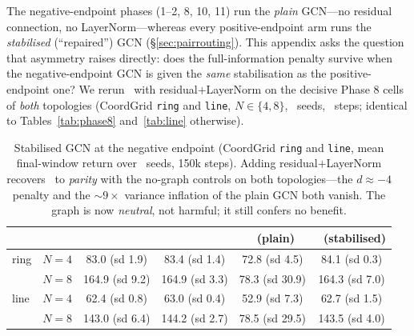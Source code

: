 \begin{appendices}
The negative-endpoint phases (1--2, 8, 10, 11) run the \emph{plain}
GCN---no residual connection, no LayerNorm---whereas every positive-endpoint
arm runs the \emph{stabilised} (``repaired'') GCN
(\S\ref{sec:pairrouting}). This appendix asks the question that asymmetry
raises directly: does the full-information penalty survive when the
negative-endpoint GCN is given the \emph{same} stabilisation as the
positive-endpoint one? We rerun \gnnqmix\ with residual$+$LayerNorm on the
decisive Phase 8 cells of \emph{both} topologies (CoordGrid \texttt{ring}
and \texttt{line}, $N\in\{4,8\}$,
\PEseeds\ seeds, \PEsteps\ steps; identical to Tables~\ref{tab:phase8}
and~\ref{tab:line} otherwise).

\begin{table}[!ht]
  \centering
  \footnotesize
  \caption{Stabilised GCN at the negative endpoint (CoordGrid
  \texttt{ring} and \texttt{line}, mean final-window return over \PEseeds\
  seeds, 150k steps).
  Adding residual$+$LayerNorm recovers \gnnqmix\ to \emph{parity} with the
  no-graph controls on both topologies---the $d{\approx}{-}4$ penalty and the
  ${\sim}9\times$
  variance inflation of the plain GCN both vanish. The graph is now
  \emph{neutral}, not harmful; it still confers no benefit.}
  \label{tab:repaired}
  \begin{tabular}{llcccc}
    \toprule
    & & \qmix & \mlpqmix & \gnnqmix\ (plain) & \gnnqmix\ (stabilised) \\
    \midrule
    ring & $N=4$ & 83.0 (sd 1.9) & 83.4 (sd 1.4) & 72.8 (sd 4.5) & 84.1 (sd 0.3) \\
         & $N=8$ & 164.9 (sd 9.2) & 164.9 (sd 3.3) & 78.3 (sd 30.9) & 164.3 (sd 7.0) \\
    line & $N=4$ & 62.4 (sd 0.8) & 63.0 (sd 0.4) & 52.9 (sd 7.3) & 62.7 (sd 1.5) \\
         & $N=8$ & 143.0 (sd 6.4) & 144.2 (sd 2.7) & 78.5 (sd 29.5) & 143.5 (sd 4.0) \\
    \bottomrule
  \end{tabular}
\end{table}


\end{appendices}
